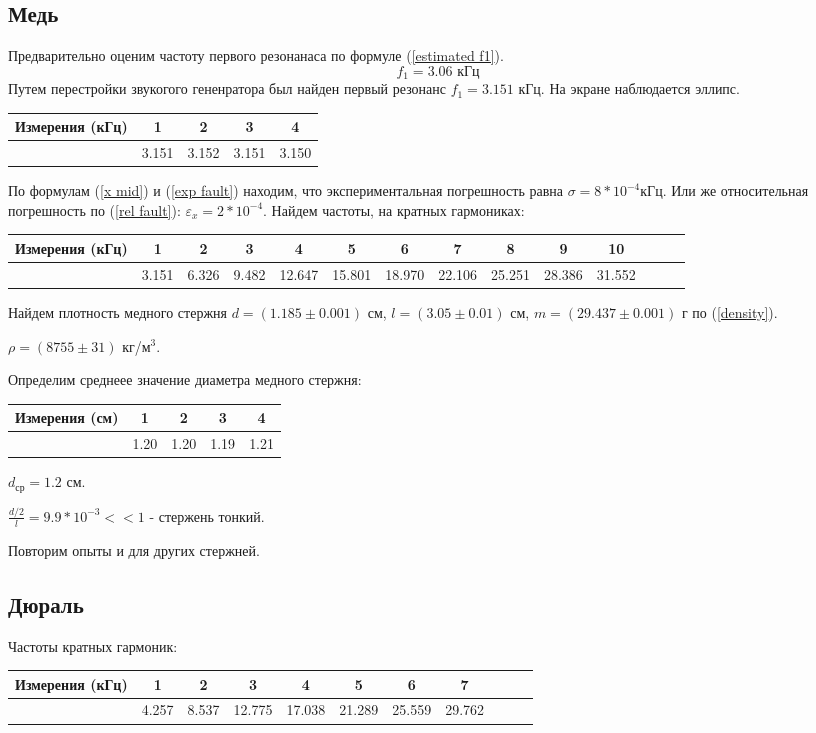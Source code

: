 \documentclass[a4paper,10pt]{article}
\begin{document}
	\subsection{Медь}
	Предварительно оценим частоту первого резонанаса по формуле (\ref{estimated f1}).
	\[f_1 = 3.06 \text{ кГц}\] 
	Путем перестройки звукогого гененратора был найден первый резонанс $f_1 = 3.151$ кГц. На экране наблюдается эллипс.
	\begin{center}
		\begin{tabular}{|c||c|c|c|c|}
			\hline
			Измерения (кГц) & 1 & 2 & 3 & 4 \\
			\hline
			& 3.151 & 3.152 & 3.151 & 3.150 \\
			\hline
		\end{tabular}
	\end{center}
	По формулам (\ref{x mid}) и (\ref{exp fault}) находим, что экспериментальная погрешность равна $\sigma = 8 * 10^{-4} \text{кГц}$. Или же относительная погрешность по (\ref{rel fault}): $\varepsilon_x = 2 * 10^{-4}$.
	Найдем частоты, на кратных гармониках: 
	\begin{center}
		\begin{tabular}{|c||c|c|c|c|c|c|c|c|c|c|c|c|c|}
			\hline
			Измерения (кГц) & 1 & 2 & 3 & 4 & 5 & 6 & 7 & 8 & 9 & 10\\
			\hline
			& 3.151 & 6.326 & 9.482 & 12.647 & 15.801 & 18.970 & 22.106 & 25.251 & 28.386 & 31.552 \\
			\hline
		\end{tabular}
	\end{center}
	Найдем плотность медного стержня $d = (1.185 \pm 0.001) \text{ см}$, $l = (3.05 \pm 0.01) \text{ см}$, $m = (29.437 \pm 0.001) \text{ г}$ по (\ref{density}).
	
	$\rho = (8755 \pm 31)$ кг/м$^3$.
	
	Определим среднеее значение диаметра медного стержня:
	\begin{center}
		\begin{tabular}{|c||c|c|c|c|}
			\hline
			Измерения (см) & 1 & 2 & 3 & 4 \\
			\hline
			& 1.20 & 1.20 & 1.19 & 1.21 \\
			\hline
		\end{tabular}
	\end{center}
	$d_\text{ср} = 1.2$ см.
	
	$\frac{d / 2}{l} = 9.9 * 10^{-3} << 1$ - стержень тонкий.
	
	Повторим опыты и для других стержней.
	\subsection{Дюраль}
	Частоты кратных гармоник: 
	\begin{center}
		\begin{tabular}{|c||c|c|c|c|c|c|c|c|c|c|}
			\hline
			Измерения (кГц) & 1 & 2 & 3 & 4 & 5 & 6 & 7 \\
			\hline
			& 4.257 & 8.537 & 12.775 & 17.038 & 21.289 & 25.559 & 29.762\\
			\hline
		\end{tabular}
	\end{center}
	
\end{document}
